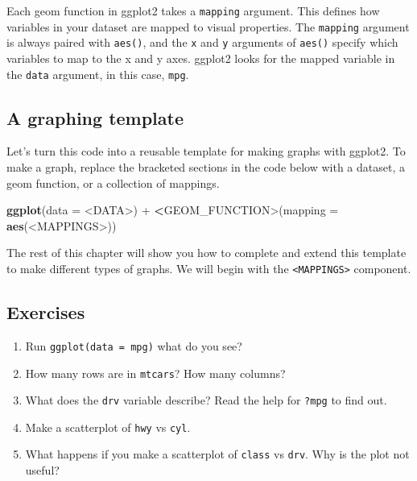 \documentclass[]{book}
\newenvironment{Shaded}{\begin{snugshade}}{\end{snugshade}}
\newcommand{\KeywordTok}[1]{\textcolor[rgb]{0.13,0.29,0.53}{\textbf{{#1}}}}
\newcommand{\DataTypeTok}[1]{\textcolor[rgb]{0.13,0.29,0.53}{{#1}}}
\newcommand{\StringTok}[1]{\textcolor[rgb]{0.31,0.60,0.02}{{#1}}}
\newcommand{\ErrorTok}[1]{\textcolor[rgb]{0.64,0.00,0.00}{\textbf{{#1}}}}
\newcommand{\NormalTok}[1]{{#1}}
\begin{document}
Each geom function in ggplot2 takes a \texttt{mapping} argument. This
defines how variables in your dataset are mapped to visual properties.
The \texttt{mapping} argument is always paired with \texttt{aes()}, and
the \texttt{x} and \texttt{y} arguments of \texttt{aes()} specify which
variables to map to the x and y axes. ggplot2 looks for the mapped
variable in the \texttt{data} argument, in this case, \texttt{mpg}.

\subsection{A graphing template}\label{a-graphing-template}

Let's turn this code into a reusable template for making graphs with
ggplot2. To make a graph, replace the bracketed sections in the code
below with a dataset, a geom function, or a collection of mappings.

\begin{Shaded}
\begin{Highlighting}[]
\KeywordTok{ggplot}\NormalTok{(}\DataTypeTok{data =} \NormalTok{<DATA>) +}\StringTok{ }
\StringTok{  }\ErrorTok{<}\NormalTok{GEOM_FUNCTION>(}\DataTypeTok{mapping =} \KeywordTok{aes}\NormalTok{(<MAPPINGS>))}
\end{Highlighting}
\end{Shaded}

The rest of this chapter will show you how to complete and extend this
template to make different types of graphs. We will begin with the
\texttt{\textless{}MAPPINGS\textgreater{}} component.

\subsection{Exercises}\label{exercises}

\begin{enumerate}
\def\labelenumi{\arabic{enumi}.}
\item
  Run \texttt{ggplot(data\ =\ mpg)} what do you see?
\item
  How many rows are in \texttt{mtcars}? How many columns?
\item
  What does the \texttt{drv} variable describe? Read the help for
  \texttt{?mpg} to find out.
\item
  Make a scatterplot of \texttt{hwy} vs \texttt{cyl}.
\item
  What happens if you make a scatterplot of \texttt{class} vs
  \texttt{drv}. Why is the plot not useful?
\end{enumerate}
\end{document}
